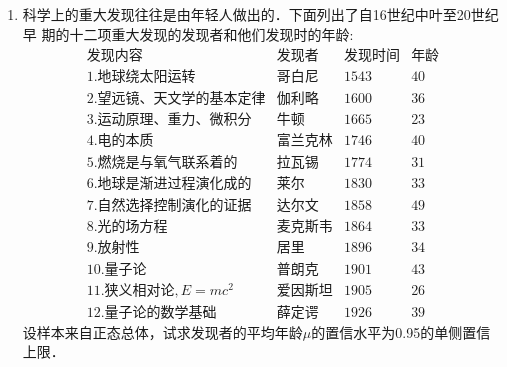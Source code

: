 \begin{enumerate}
    \item 科学上的重大发现往往是由年轻人做出的．下面列出了自16世纪中叶至20世纪早
    期的十二项重大发现的发现者和他们发现时的年龄:
    $$\begin{array}{llll}
        \mbox{发现内容} & \mbox{发现者} & \mbox{发现时间} & \mbox{年龄}\\
        \mbox{1.地球绕太阳运转} & \mbox{哥白尼} & 1543   &   40 \\  
        \mbox{2.望远镜、天文学的基本定律} & \mbox{伽利略} &  1600  & 36   \\  
        \mbox{3.运动原理、重力、微积分} & \mbox{牛顿} &  1665  &  23  \\  
        \mbox{4.电的本质} & \mbox{富兰克林} &   1746 &  40  \\  
        \mbox{5.燃烧是与氧气联系着的} & \mbox{拉瓦锡} & 1774   &  31  \\  
        \mbox{6.地球是渐进过程演化成的} & \mbox{莱尔} &  1830  &  33  \\  
        \mbox{7.自然选择控制演化的证据} & \mbox{达尔文} &  1858  & 49   \\  
        \mbox{8.光的场方程} & \mbox{麦克斯韦} &  1864  &  33  \\  
        \mbox{9.放射性} & \mbox{居里} &  1896  &  34  \\  
        \mbox{10.量子论} & \mbox{普朗克} & 1901   &  43  \\  
        \mbox{11.狭义相对论},E=mc^2 & \mbox{爱因斯坦} &  1905  &  26  \\  
        \mbox{12.量子论的数学基础} & \mbox{薛定谔} & 1926   &  39  
    \end{array}$$
    设样本来自正态总体，试求发现者的平均年龄$\mu$的置信水平为0.95的单侧置信上限．


    


  

\end{enumerate}

